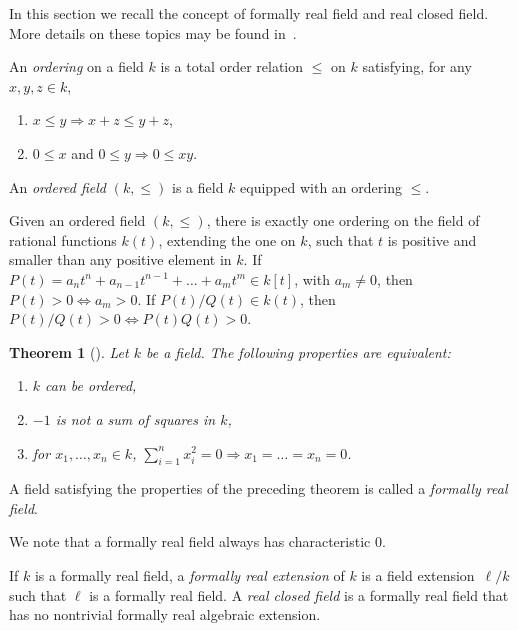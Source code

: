 \documentclass[pdftex]{sigma}%
\numberwithin{equation}{section}
\newtheorem{Theorem}{Theorem}[section]
\begin{document}
In this section we recall the concept of formally real field and real closed field. More details on these topics may be found in~\cite{BCR,Pre}.

\begin{Definition} An \emph{ordering} on a field $k$ is a total order relation $\leq$ on $k$ satisfying, for any $x,y,z \in k$,
\begin{enumerate}\itemsep=0pt
\item[$(i)$] $x\leq y \Rightarrow x+z \leq y+z$,
\item[$(ii)$] $0\leq x$ and $0\leq y \Rightarrow 0\leq xy$.
\end{enumerate}

An \emph{ordered field} $(k,\leq)$ is a field $k$ equipped with an ordering $\leq$.
\end{Definition}

\begin{Remark}\label{ord}
Given an ordered field $(k,\leq)$, there is exactly one ordering on the field of rational functions $k(t)$, extending the one on $k$, such that $t$ is positive and smaller than any positive element in $k$. If $P(t)=a_n t^n+a_{n-1}t^{n-1}+\dots+a_m t^m \in k[t]$, with $a_m \neq 0$, then $P(t) >0 \Leftrightarrow a_m>0$. If $P(t)/Q(t) \in k(t)$, then $P(t)/Q(t)>0 \Leftrightarrow P(t)Q(t)>0$.
\end{Remark}

\begin{Theorem}[{\cite[Theorem~1.1.8]{BCR}}] Let $k$ be a field. The following properties are equivalent:
\begin{enumerate}\itemsep=0pt
\item[$(i)$] $k$ can be ordered,
\item[$(ii)$] $-1$ is not a sum of squares in $k$,
\item[$(iii)$] for $x_1,\dots,x_n \in k$, $\sum_{i=1}^n x_i^2=0 \Rightarrow x_1=\dots =x_n=0$.
\end{enumerate}
\end{Theorem}

\begin{Definition} A field satisfying the properties of the preceding theorem is called a \emph{formally real field}.
\end{Definition}

We note that a formally real field always has characteristic $0$.


\begin{Definition} If $k$ is a formally real field, a \emph{formally real extension} of $k$ is a field extension~$\ell/k$ such that $\ell$ is a formally real field. A \emph{real closed field} is a formally real field that has no nontrivial formally real algebraic extension.
\end{Definition}
\end{document}
